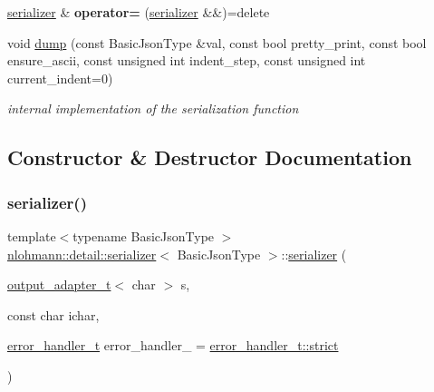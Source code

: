 \begin{DoxyCompactItemize}
\mbox{\hyperlink{classnlohmann_1_1detail_1_1serializer}{serializer}} \& {\bfseries operator=} (\mbox{\hyperlink{classnlohmann_1_1detail_1_1serializer}{serializer}} \&\&)=delete
\item 
void \mbox{\hyperlink{classnlohmann_1_1detail_1_1serializer_a95460ebd1a535a543e5a0ec52e00f48b}{dump}} (const Basic\+Json\+Type \&val, const bool pretty\+\_\+print, const bool ensure\+\_\+ascii, const unsigned int indent\+\_\+step, const unsigned int current\+\_\+indent=0)
\begin{DoxyCompactList}\small\item\em internal implementation of the serialization function \end{DoxyCompactList}\end{DoxyCompactItemize}


\subsection{Constructor \& Destructor Documentation}
\mbox{\label{classnlohmann_1_1detail_1_1serializer_ac010525281d97867ee842da37294fe83}} 
\subsubsection{\texorpdfstring{serializer()}{serializer()}}
{\footnotesize\ttfamily template$<$typename Basic\+Json\+Type $>$ \\
\mbox{\hyperlink{classnlohmann_1_1detail_1_1serializer}{nlohmann\+::detail\+::serializer}}$<$ Basic\+Json\+Type $>$\+::\mbox{\hyperlink{classnlohmann_1_1detail_1_1serializer}{serializer}} (\begin{DoxyParamCaption}\item[{\mbox{\hyperlink{namespacenlohmann_1_1detail_a9b680ddfb58f27eb53a67229447fc556}{output\+\_\+adapter\+\_\+t}}$<$ char $>$}]{s,  }\item[{const char}]{ichar,  }\item[{\mbox{\hyperlink{namespacenlohmann_1_1detail_a5a76b60b26dc8c47256a996d18d967df}{error\+\_\+handler\+\_\+t}}}]{error\+\_\+handler\+\_\+ = {\ttfamily \mbox{\hyperlink{namespacenlohmann_1_1detail_a5a76b60b26dc8c47256a996d18d967dfa2133fd717402a7966ee88d06f9e0b792}{error\+\_\+handler\+\_\+t\+::strict}}} }\end{DoxyParamCaption})\hspace{0.3cm}{\ttfamily [inline]}}


